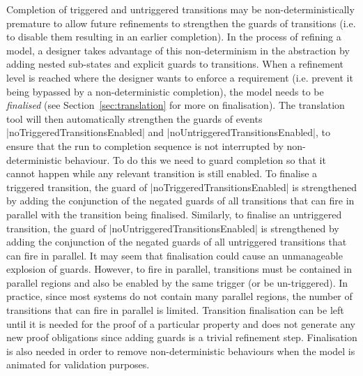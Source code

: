 Completion of triggered and untriggered transitions may be non-deterministically premature to allow future refinements to strengthen the guards of transitions (i.e. to disable them resulting in an earlier completion).
In the process of refining a model, a designer takes advantage of this non-determinism in the abstraction by adding nested sub-states and explicit guards to transitions. 
When a refinement level is reached where the designer wants to enforce a requirement (i.e. prevent it being bypassed by a non-deterministic completion), the model needs to be \emph{finalised} (see Section~\ref{sec:translation} for more on finalisation). 
The \SCXML translation tool will then automatically strengthen the guards of events |noTriggeredTransitionsEnabled| and |noUntriggeredTransitionsEnabled|, to ensure that the run to completion sequence is not interrupted by non-deterministic behaviour. 
To do this we need to guard completion so that it cannot happen while any relevant transition is still enabled.
To finalise a triggered transition, the guard of |noTriggeredTransitionsEnabled| is strengthened by adding the conjunction of the negated guards of all transitions that can fire in parallel with the transition being finalised.
Similarly, to finalise an untriggered transition, the guard of |noUntriggeredTransitionsEnabled| is strengthened by adding the conjunction of the negated guards of all untriggered transitions that can fire in parallel.
It may seem that finalisation could cause an unmanageable explosion of guards.
However, to fire in parallel, transitions must be contained in parallel regions and also be enabled by the same trigger (or be un-triggered).
In practice, since most systems do not contain many parallel regions, the number of transitions that can fire in parallel is limited.
Transition finalisation can be left until it is needed for the proof of a particular property and does not generate any new proof obligations since adding guards is a trivial refinement step.
Finalisation is also needed in order to remove non-deterministic behaviours when the model is animated for validation purposes.



